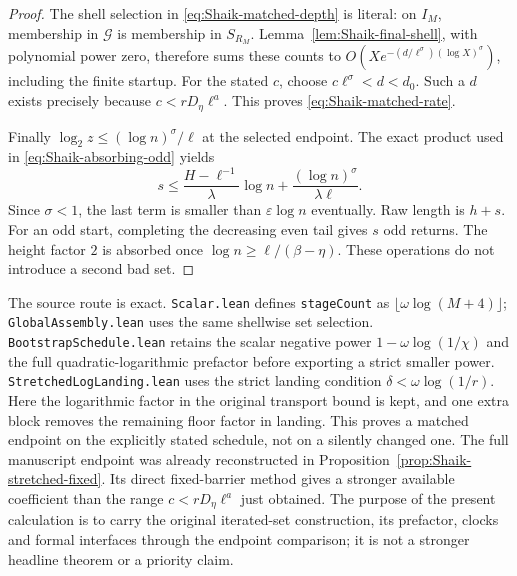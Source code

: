 \begin{proof}
The shell selection in \eqref{eq:Shaik-matched-depth} is literal:
on \(I_M\), membership in \(\mathcal G\) is membership in \(S_{R_M}\).
Lemma~\ref{lem:Shaik-final-shell}, with polynomial power zero, therefore
sums these counts to
\(O(Xe^{-(d/\ell^\sigma)(\log X)^\sigma})\), including the finite
startup. For the stated \(c\), choose
\(c\ell^\sigma<d<d_0\). Such a \(d\) exists precisely because
\(c<rD_\eta\ell^a\). This proves \eqref{eq:Shaik-matched-rate}.

Finally \(\log_2z\le(\log n)^\sigma/\ell\) at the selected endpoint.
The exact product used in \eqref{eq:Shaik-absorbing-odd} yields
\[
 s\le\frac{H-\ell^{-1}}{\lambda}\log n
       +\frac{(\log n)^\sigma}{\lambda\ell}.
\]
Since \(\sigma<1\), the last term is smaller than
\(\varepsilon\log n\) eventually. Raw length is \(h+s\).
For an odd start, completing the decreasing even tail gives \(s\)
odd returns. The height factor \(2\) is absorbed once
\(\log n\ge\ell/(\beta-\eta)\).
These operations do not introduce a second bad set.
\end{proof}

The source route is exact. \texttt{Scalar.lean} defines
\texttt{stageCount} as \(\lfloor\omega\log(M+4)\rfloor\);
\texttt{GlobalAssembly.lean} uses the same shellwise set selection.
\texttt{BootstrapSchedule.lean} retains the scalar negative power
\(1-\omega\log(1/\chi)\) and the full quadratic-logarithmic prefactor
before exporting a strict smaller power.
\texttt{StretchedLogLanding.lean} uses the strict landing condition
\(\delta<\omega\log(1/r)\).
Here the logarithmic factor in the original transport bound is kept,
and one extra block removes the remaining floor factor in landing.
This proves a matched endpoint on the explicitly stated schedule,
not on a silently changed one.
The full manuscript endpoint was already reconstructed in
Proposition~\ref{prop:Shaik-stretched-fixed}. Its direct fixed-barrier
method gives a stronger available coefficient than the range
\(c<rD_\eta\ell^a\) just obtained. The purpose of the present calculation
is to carry the original iterated-set construction, its prefactor,
clocks and formal interfaces through the endpoint comparison;
it is not a stronger headline theorem or a priority claim.

